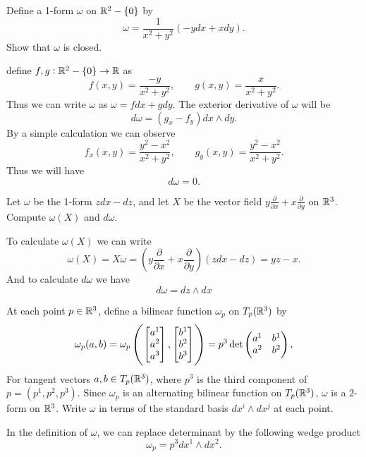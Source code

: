 \begin{problem}
	Define a 1-form $ \omega $ on $ \mathbb{R}^2 - \{0\} $ by
	\[ \omega = \frac{1}{x^2+y^2}(-ydx + xdy). \]
	Show that $ \omega $ is closed.
\end{problem}
\begin{solution}
	define $ f,g: \mathbb{R}^2-\{0\} \to \mathbb{R} $ as 
	\[ f(x,y) = \frac{-y}{x^2 + y^2}, \qquad g(x,y) = \frac{x}{x^2 + y^2}. \]
	Thus we can write $ \omega $ as $ \omega = f dx + g dy $. The exterior derivative of $ \omega $ will be
	\[ d\omega = (g_x - f_y) dx \wedge dy. \]
	By a simple calculation we can observe
	\[ f_x(x,y) = \frac{y^2 - x^2}{x^2 + y^2}, \qquad g_y(x,y) = \frac{y^2 - x^2 }{x^2 + y^2}. \]
	Thus we will have
	\[ d\omega = 0. \]
\end{solution}


\begin{problem}
	Let $ \omega $ be the 1-form $ zdx - dz $, and let $ X $ be the vector field $ y \frac{\partial}{\partial x} + x \frac{\partial}{\partial y} $ on $ \mathbb{R}^3 $. Compute $ \omega(X) $ and $ d\omega $.
\end{problem}
\begin{solution}
	To calculate $ \omega(X) $ we can write
	\[ \omega(X) = X \omega = (y \frac{\partial}{\partial x} + x \frac{\partial}{\partial y})( zdx - dz) = yz - x. \]
	And to calculate $ d\omega $ we have
	\[ d\omega  =  dz \wedge dx \]
\end{solution}

\begin{problem}
	At each point $ p \in \mathbb{R}^3 $, define a bilinear function $ \omega_p  $ on $ T_p(\mathbb{R}^3) $  by
	\[ \omega_p(a,b) = \omega_p\left( \begin{bmatrix} a^1 \\ a^2 \\ a^3 \end{bmatrix}, \begin{bmatrix} b^1 \\ b^2 \\ b^3 \end{bmatrix}\right) = p^3 \det\begin{pmatrix} a^1 & b^1 \\ a^2 & b^2 \end{pmatrix}, \]
	For tangent vectors $ a,b\in T_p(\mathbb{R}^3) $, where $ p^3 $ is the third component of $ p = (p^1, p^2, p^3) $. Since $ \omega_p $ is an alternating bilinear function on $ T_p(\mathbb{R}^3) $, $ \omega $ is a 2-form on $ \mathbb{R}^3 $. Write $ \omega $ in terms of the standard basis $ dx^i \wedge dx^j $ at each point.
\end{problem}
\begin{solution}
	In the definition of $ \omega $, we can replace determinant by the following wedge product 
	\[ \omega_p = p^3 dx^1 \wedge dx^2.  \]
\end{solution}

